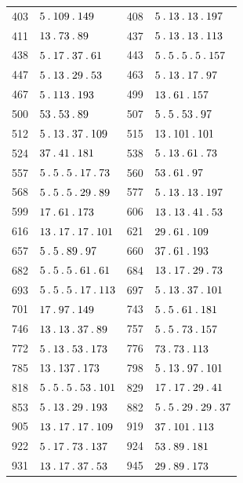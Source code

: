 \begin{longtable}{@{}r|l@{\qquad}r|l@{}}
403 & $5\mathbin{.} 109\mathbin{.} 149$ & 408 & $5\mathbin{.} 13\mathbin{.} 13\mathbin{.} 197$\\
411 & $13\mathbin{.} 73\mathbin{.} 89$ & 437 & $5\mathbin{.} 13\mathbin{.} 13\mathbin{.} 113$\\
438 & $5\mathbin{.} 17\mathbin{.} 37\mathbin{.} 61$ & 443 & $5\mathbin{.} 5\mathbin{.} 5\mathbin{.} 5\mathbin{.} 157$\\
447 & $5\mathbin{.} 13\mathbin{.} 29\mathbin{.} 53$ & 463 & $5\mathbin{.} 13\mathbin{.} 17\mathbin{.} 97$\\
467 & $5\mathbin{.} 113\mathbin{.} 193$ & 499 & $13\mathbin{.} 61\mathbin{.} 157$\\
500 & $53\mathbin{.} 53\mathbin{.} 89$ & 507 & $5\mathbin{.} 5\mathbin{.} 53\mathbin{.} 97$\\
512 & $5\mathbin{.} 13\mathbin{.} 37\mathbin{.} 109$ & 515 & $13\mathbin{.} 101\mathbin{.} 101$\\
524 & $37\mathbin{.} 41\mathbin{.} 181$ & 538 & $5\mathbin{.} 13\mathbin{.} 61\mathbin{.} 73$\\
557 & $5\mathbin{.} 5\mathbin{.} 5\mathbin{.} 17\mathbin{.} 73$ & 560 & $53\mathbin{.} 61\mathbin{.} 97$\\
568 & $5\mathbin{.} 5\mathbin{.} 5\mathbin{.} 29\mathbin{.} 89$ & 577 & $5\mathbin{.} 13\mathbin{.} 13\mathbin{.} 197$\\
599 & $17\mathbin{.} 61\mathbin{.} 173$ & 606 & $13\mathbin{.} 13\mathbin{.} 41\mathbin{.} 53$\\
616 & $13\mathbin{.} 17\mathbin{.} 17\mathbin{.} 101$ & 621 & $29\mathbin{.} 61\mathbin{.} 109$\\
657 & $5\mathbin{.} 5\mathbin{.} 89\mathbin{.} 97$ & 660 & $37\mathbin{.} 61\mathbin{.} 193$\\
682 & $5\mathbin{.} 5\mathbin{.} 5\mathbin{.} 61\mathbin{.} 61$ & 684 & $13\mathbin{.} 17\mathbin{.} 29\mathbin{.} 73$\\
693 & $5\mathbin{.} 5\mathbin{.} 5\mathbin{.} 17\mathbin{.} 113$ & 697 & $5\mathbin{.} 13\mathbin{.} 37\mathbin{.} 101$\\
701 & $17\mathbin{.} 97\mathbin{.} 149$ & 743 & $5\mathbin{.} 5\mathbin{.} 61\mathbin{.} 181$\\
746 & $13\mathbin{.} 13\mathbin{.} 37\mathbin{.} 89$ & 757 & $5\mathbin{.} 5\mathbin{.} 73\mathbin{.} 157$\\
772 & $5\mathbin{.} 13\mathbin{.} 53\mathbin{.} 173$ & 776 & $73\mathbin{.} 73\mathbin{.} 113$\\
785 & $13\mathbin{.} 137\mathbin{.} 173$ & 798 & $5\mathbin{.} 13\mathbin{.} 97\mathbin{.} 101$\\
818 & $5\mathbin{.} 5\mathbin{.} 5\mathbin{.} 53\mathbin{.} 101$ & 829 & $17\mathbin{.} 17\mathbin{.} 29\mathbin{.} 41$\\
853 & $5\mathbin{.} 13\mathbin{.} 29\mathbin{.} 193$ & 882 & $5\mathbin{.} 5\mathbin{.} 29\mathbin{.} 29\mathbin{.} 37$\\
905 & $13\mathbin{.} 17\mathbin{.} 17\mathbin{.} 109$ & 919 & $37\mathbin{.} 101\mathbin{.} 113$\\
922 & $5\mathbin{.} 17\mathbin{.} 73\mathbin{.} 137$ & 924 & $53\mathbin{.} 89\mathbin{.} 181$\\
931 & $13\mathbin{.} 17\mathbin{.} 37\mathbin{.} 53$ & 945 & $29\mathbin{.} 89\mathbin{.} 173$\\

\end{longtable}
